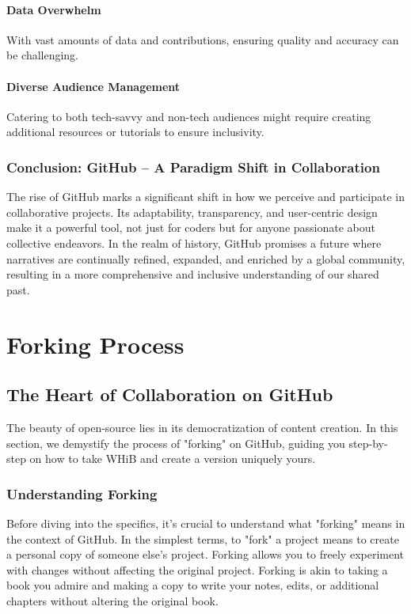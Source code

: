 \documentclass[a4paper,12pt]{book}
\begin{document}
\subsubsection*{Data Overwhelm}
With vast amounts of data and contributions, ensuring quality and accuracy can be challenging.

\subsubsection*{Diverse Audience Management}
Catering to both tech-savvy and non-tech audiences might require creating additional resources or tutorials to ensure inclusivity.

\subsection*{Conclusion: GitHub – A Paradigm Shift in Collaboration}
The rise of GitHub marks a significant shift in how we perceive and participate in collaborative projects. Its adaptability, transparency, and user-centric design make it a powerful tool, not just for coders but for anyone passionate about collective endeavors. In the realm of history, GitHub promises a future where narratives are continually refined, expanded, and enriched by a global community, resulting in a more comprehensive and inclusive understanding of our shared past.

\chapter{Forking Process}
\section*{The Heart of Collaboration on GitHub}
The beauty of open-source lies in its democratization of content creation. In this section, we demystify the process of "forking" on GitHub, guiding you step-by-step on how to take WHiB and create a version uniquely yours.

\subsection*{Understanding Forking}
Before diving into the specifics, it's crucial to understand what "forking" means in the context of GitHub. In the simplest terms, to "fork" a project means to create a personal copy of someone else's project. Forking allows you to freely experiment with changes without affecting the original project. Forking is akin to taking a book you admire and making a copy to write your notes, edits, or additional chapters without altering the original book.
\end{document}
